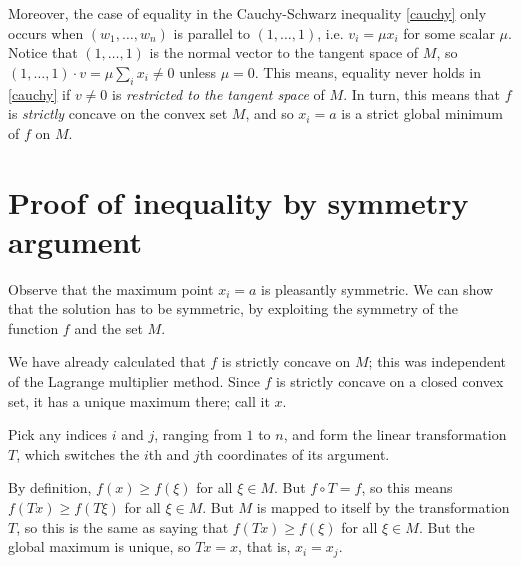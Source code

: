 \documentclass[12pt]{article}
\begin{document}
Moreover, the case of equality in the Cauchy-Schwarz inequality \eqref{cauchy}
only occurs when $(w_1, \dotsc, w_n)$ is parallel to $(1, \dotsc, 1)$,
i.e. $v_i = \mu x_i$ for some scalar $\mu$.
Notice that $(1, \dotsc, 1)$ is the normal vector to
the tangent space of $M$,
so $(1, \dotsc, 1) \cdot v = \mu \sum_i x_i \neq 0$
unless $\mu = 0$.
This means, equality never holds in \eqref{cauchy}
if $v \neq 0$ is \emph{restricted to the tangent space} of $M$.
In turn, this means that $f$ is \emph{strictly} concave
on the convex set $M$, and
so $x_i = a$ is a strict global minimum of $f$ on $M$.

\section*{Proof of inequality by symmetry argument}
%
%
%

Observe that the maximum point $x_i = a$ is pleasantly symmetric.
We can show that the solution has to be symmetric,
by exploiting the symmetry of the function $f$ and the set $M$.

We have already calculated that $f$ is strictly concave on $M$;
this was independent of the Lagrange multiplier method.
Since $f$ is strictly concave on a closed convex set,
it has a unique maximum there; call it $x$.

Pick any indices $i$ and $j$, ranging from $1$ to $n$, and form
the linear transformation $T$, which switches the $i$th and $j$th coordinates
of its argument.

By definition, $f(x) \geq f(\xi)$ for all $\xi \in M$.
But $f \circ T = f$, so this means $f(Tx) \geq f(T\xi)$ for all $\xi \in M$.
But $M$ is mapped to itself by the transformation $T$,
so this is the same as saying that $f(Tx) \geq f(\xi)$ for all $\xi \in M$.
But the global maximum is unique, so $Tx = x$,
that is, $x_i = x_j$.
\end{document}
